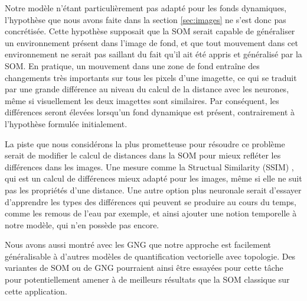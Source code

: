 	Notre modèle n'étant particulièrement pas adapté pour les fonds dynamiques, l'hypothèse que nous avons faite dans la section \ref{sec:images} ne s'est donc pas concrétisée. Cette hypothèse supposait que la SOM serait capable de généraliser un environnement présent dans l'image de fond, et que tout mouvement dans cet environnement ne serait pas saillant du fait qu'il ait été appris et généralisé par la SOM. En pratique, un mouvement dans une zone de fond entraîne des changements très importants sur tous les pixels d'une imagette, ce qui se traduit par une grande différence au niveau du calcul de la distance avec les neurones, même si visuellement les deux imagettes sont similaires. Par conséquent, les différences seront élevées lorsqu'un fond dynamique est présent, contrairement à l'hypothèse formulée initialement.

	La piste que nous considérons la plus prometteuse pour résoudre ce problème serait de modifier le calcul de distances dans la SOM pour mieux refléter les différences dans les images. Une mesure comme la Structual Similarity (SSIM) \cite{wang2004image}, qui est un calcul de différences mieux adapté pour les images, même si elle ne suit pas les propriétés d'une distance. Une autre option plus neuronale serait d'essayer d'apprendre les types des différences qui peuvent se produire au cours du temps, comme les remous de l'eau par exemple, et ainsi ajouter une notion temporelle à notre modèle, qui n'en possède pas encore.

	Nous avons aussi montré avec les GNG que notre approche est facilement généralisable à d'autres modèles de quantification vectorielle avec topologie. Des variantes de SOM ou de GNG pourraient ainsi être essayées pour cette tâche pour potentiellement amener à de meilleurs résultats que la SOM classique sur cette application.




